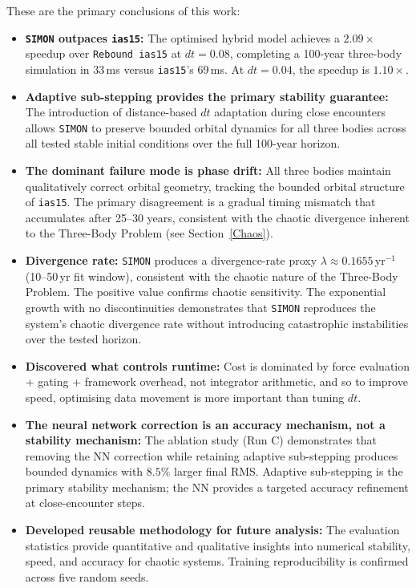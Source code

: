 \documentclass[12pt]{article}
\begin{document}
These are the primary conclusions of this work:

\begin{itemize}
    \item \textbf{\texttt{SIMON} outpaces \texttt{ias15}:} The optimised hybrid model achieves a $2.09\times$ speedup over \texttt{Rebound ias15} at $dt = 0.08$, completing a 100-year three-body simulation in 33\,ms versus \texttt{ias15}'s 69\,ms. At $dt = 0.04$, the speedup is $1.10\times$.
    \item \textbf{Adaptive sub-stepping provides the primary stability guarantee:} The introduction of distance-based $dt$ adaptation during close encounters allows \texttt{SIMON} to preserve bounded orbital dynamics for all three bodies across all tested stable initial conditions over the full 100-year horizon.
    \item \textbf{The dominant failure mode is phase drift:} All three bodies maintain qualitatively correct orbital geometry, tracking the bounded orbital structure of \texttt{ias15}. The primary disagreement is a gradual timing mismatch that accumulates after 25--30 years, consistent with the chaotic divergence inherent to the Three-Body Problem (see Section~\ref{Chaos}).
    \item \textbf{Divergence rate:} \texttt{SIMON} produces a divergence-rate proxy $\lambda \approx 0.1655$\,yr$^{-1}$ (10--50\,yr fit window), consistent with the chaotic nature of the Three-Body Problem. The positive value confirms chaotic sensitivity. The exponential growth with no discontinuities demonstrates that \texttt{SIMON} reproduces the system's chaotic divergence rate without introducing catastrophic instabilities over the tested horizon.
    \item \textbf{Discovered what controls runtime:} Cost is dominated by force evaluation + gating + framework overhead, not integrator arithmetic, and so to improve speed, optimising data movement is more important than tuning $dt$.
    \item \textbf{The neural network correction is an accuracy mechanism, not a stability mechanism:} The ablation study (Run C) demonstrates that removing the NN correction while retaining adaptive sub-stepping produces bounded dynamics with $8.5\%$ larger final RMS. Adaptive sub-stepping is the primary stability mechanism; the NN provides a targeted accuracy refinement at close-encounter steps.
    \item \textbf{Developed reusable methodology for future analysis:} The evaluation statistics provide quantitative and qualitative insights into numerical stability, speed, and accuracy for chaotic systems. Training reproducibility is confirmed across five random seeds.
\end{itemize}
\end{document}
